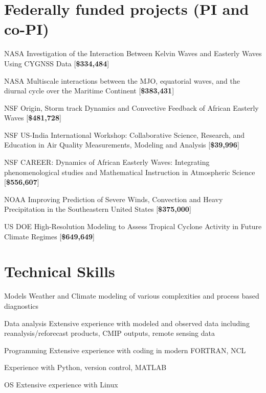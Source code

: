 \section*{Federally funded projects (PI and co-PI)}
\begin{tlist}
\item[NASA] Investigation of the Interaction Between Kelvin Waves and Easterly Waves Using CYGNSS Data  [{\bf \$334,484}]
        \vspace{2mm}

\item[NASA] Multiscale interactions between the MJO, equatorial waves, and the diurnal cycle over the Maritime Continent [{\bf\$383,431}]
              \vspace{2mm}

\item[NSF]  Origin, Storm track Dynamics and Convective Feedback of African Easterly Waves [{\bf \$481,728}]
               \vspace{2mm}

\item[NSF]  US-India International Workshop: Collaborative Science, Research, and Education in Air Quality Measurements, Modeling and Analysis [{\bf \$39,996}]
               \vspace{2mm}

\item[NSF]  CAREER: Dynamics of African Easterly Waves: Integrating phenomenological studies and Mathematical Instruction in Atmospheric Science [{\bf \$556,607}]
               \vspace{2mm}

\item[NOAA] Improving Prediction of Severe Winds, Convection and Heavy Precipitation in the Southeastern United States [{\bf\$375,000}]
               \vspace{2mm}

\item[US DOE] High-Resolution Modeling to Assess Tropical Cyclone Activity in Future Climate Regimes [{\bf\$649,649}]
\end{tlist}


\section*{Technical Skills}
\begin{tlist}
\item[Models]         Weather and Climate modeling of various complexities and process based diagnostics
  
\item[Data analysis]  Extensive experience with  modeled and observed data including reanalysis/reforecast products, CMIP outputs, remote sensing data
  
\item[Programming]    Extensive experience with coding in modern FORTRAN, NCL
  
                      Experience with Python, version control, MATLAB
  
\item[OS] Extensive experience with Linux

\end{tlist}
